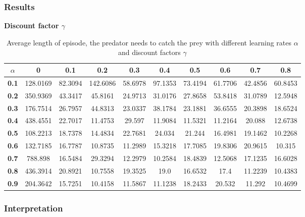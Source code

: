 \documentclass[11pt]{article}
\begin{document}
\subsubsection{Results}

\begin{center}
\begin{table*}[ht]
{\small
\hfill{}
\begin{center}
\textbf{Discount factor $\gamma$}\\
\end{center}
\begin{tabular}{c|c|c|c|c|c|c|c|c|c}
\textbf{$\alpha$} & \textbf{0} & \textbf{0.1} & \textbf{0.2} & \textbf{0.3} & \textbf{0.4} & \textbf{0.5} & \textbf{0.6} & \textbf{0.7} & \textbf{0.8}\\
	\hline
\textbf{0.1} & 128.0169 & 82.3094 & 142.6086 & 58.6978 & 97.1353 & 73.4194 & 61.7706 & 42.4856 & 60.8453\\
\textbf{0.2} & 350.9369 & 43.3417 & 45.8161 & 24.9713 & 31.0176 & 27.8658 & 53.8418 & 31.0789 & 12.5948\\
\textbf{0.3} & 176.7514 & 26.7957 & 44.8313 & 23.0337 & 38.1784 & 23.1881 & 36.6555 & 20.3898 & 18.6524\\
\textbf{0.4} & 438.4551 & 22.7017 & 11.4753 & 29.597 & 11.9084 & 11.5321 & 11.2164 & 20.088 & 12.6738\\
\textbf{0.5} & 108.2213 & 18.7378 & 14.4834 & 22.7681 & 24.034 & 21.244 & 16.4981 & 19.1462 & 10.2268\\
\textbf{0.6} & 132.7185 & 16.7787 & 10.8735 & 11.2989 & 15.3218 & 17.7085 & 19.8306 & 20.9615 & 10.315\\
\textbf{0.7} & 788.898 & 16.5484 & 29.3294 & 12.2979 & 10.2584 & 18.4839 & 12.5068 & 17.1235 & 16.6028\\
\textbf{0.8} & 436.3914 & 20.8921 & 10.7558 & 19.3525 & 19.0 & 16.6532 & 17.4 & 11.2239 & 10.4383\\
\textbf{0.9} & 204.3642 & 15.7251 & 10.4158 & 11.5867 & 11.1238 & 18.2433 & 20.532 & 11.292 & 10.4699\\
\end{tabular}}
\hfill{}
\caption{Average length of episode, the predator needs to catch the prey with different learning rates $\alpha$ and discount factors $\gamma$}
\label{table:task1}
\end{table*}
\end{center}


\subsubsection{Interpretation}
\end{document}
